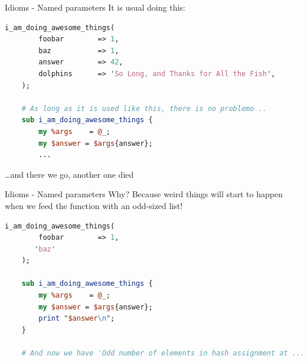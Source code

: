 \documentclass[10pt]{beamer}
\begin{document}
\begin{frame}[fragile]{Idioms - Named parameters}
It is usual doing this:

\begin{lstlisting}[language=perl]
    i_am_doing_awesome_things(
        foobar        => 1,
        baz           => 1,
        answer        => 42,
        dolphins      => 'So Long, and Thanks for All the Fish',
    );

    # As long as it is used like this, there is no problemo ..
    sub i_am_doing_awesome_things {
        my %args    = @_;
        my $answer = $args{answer};
        ...

\end{lstlisting}
\pause

\ldots and there we go, another one died

\end{frame}

\begin{frame}[fragile]{Idioms - Named parameters}
Why? Because weird things will start to happen when we feed the function with an odd-sized list!
\begin{lstlisting}[language=perl]
    i_am_doing_awesome_things(
        foobar        => 1,
       'baz'
    );

    sub i_am_doing_awesome_things {
        my %args    = @_;
        my $answer = $args{answer};
        print "$answer\n";
    }

    # And now we have 'Odd number of elements in hash assignment at ...'

\end{lstlisting}


\end{frame}
\end{document}
